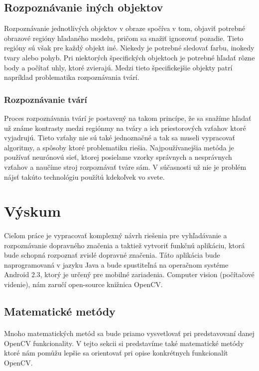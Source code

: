 \documentclass[12pt]{article}
\begin{document}
\subsection{Rozpoznávanie iných objektov}
Rozpoznávanie jednotlivých objektov v obraze spočíva v tom, objaviť potrebné obrazové regióny hľadaného modelu, pričom sa snažiť ignorovať pozadie.
Tieto regióny sú však pre každý objekt iné. Niekedy je potrebné sledovať farbu, inokedy tvary alebo pohyb. Pri niektorých špecifických objektoch je potrebné hľadať rôzne body a počítať uhly, ktoré zvierajú.
Medzi tieto špecifickejšie objekty patrí napríklad problematika rozpoznávania tvárí.
\cite{object_rec_scene}
\subsubsection{Rozpoznávanie tvárí}
Proces rozpoznávania tvárí je postavený na takom princípe, že sa snažíme hľadať už známe kontrasty medzi regiónmy na tváry a ich priestorových vzťahov ktoré vyjadrujú.
Tieto vzťahy nie sú také jednoznačné a tak sa museli vypracovať algoritmy, a spôsoby ktoré problematiku riešia. 
Najpoužívanejšia metóda je používať neurónovú sieť, ktorej posielame vzorky správnych a nesprávnych vzťahov a naučíme stroj rozpoznávať tváre sám.
V súčasnosti už nie je problém nájsť takúto technológiu použítú kdekoľvek vo svete.
\cite{object_detection_viola}
\section{Výskum}
\paragraph{}
Cieľom práce je vypracovať komplexný návrh riešenia pre vyhľadávanie a rozpoznávanie dopravného značenia a taktiež vytvoriť funkčnú aplikáciu, ktorá
bude schopná rozpoznať zvislé dopravné značenia. Táto aplikácia bude naprogramovaná v jazyku Java a bude spustiteľná na
 operačnom systéme Android 2.3, ktorý je určený pre mobilné zariadenia. Computer vision (počítačové videnie), nám zaručí open-source knižnica OpenCV.
\subsection{Matematické metódy}
\paragraph{}
Mnoho matematických metód sa bude priamo vysvetlovať pri predstavovaní danej OpenCV funkcionality.
V tejto sekcii si predstavíme také matematické metódy ktoré nám pomůžu lepšie sa orientovať pri opise konkrétnych funkcionalít OpenCV.
\end{document}
